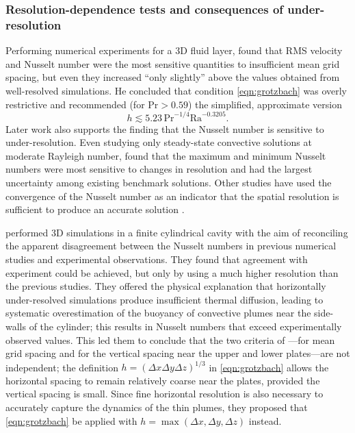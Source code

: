 \documentclass[titlepage]{article}
\numberwithin{equation}{section}
\newcommand{\prandtl}{\ensuremath{\mathrm{Pr}}}
\newcommand{\rayleigh}{\ensuremath{\mathrm{Ra}}}
\begin{document}
\subsubsection{
    Resolution-dependence tests and consequences of under-resolution}%
\label{sec:res_tests}

Performing numerical experiments for a 3D fluid layer,
\citeauthor{grotzbach1983} found that RMS velocity and Nusselt number were
the most sensitive quantities to insufficient mean grid spacing, but even
they increased ``only slightly'' above the values obtained from well-resolved
simulations. He concluded that condition \cref{eqn:grotzbach} was overly
restrictive and recommended (for $\prandtl > 0.59$) the simplified,
approximate version
\[ %
    h \lesssim 5.23 \, \prandtl^{-1/4} \rayleigh^{-0.3205}.
\]
Later work also supports the finding that the Nusselt number is
sensitive to under-resolution. Even studying only steady-state convective
solutions at moderate Rayleigh number, \textcite{le_quere1991} found that the
maximum and minimum Nusselt numbers were most sensitive to changes in
resolution and had the largest uncertainty among existing benchmark solutions.
Other studies have used the convergence of the Nusselt number as an indicator
that the spatial resolution is sufficient to produce an accurate solution
\parencite{ouertatani2008}.

\textcite{stevens2010} performed 3D simulations in a finite cylindrical cavity
with the aim of reconciling the apparent disagreement between the Nusselt
numbers in previous numerical studies and experimental observations. They found
that agreement with experiment could be achieved, but only by using a much
higher resolution than the previous studies. They offered the physical
explanation that horizontally under-resolved simulations produce insufficient
thermal diffusion, leading to systematic overestimation of the buoyancy of
convective plumes near the side-walls of the cylinder; this results in Nusselt
numbers that exceed experimentally observed values. This led them to conclude
that the two criteria of \textcite{grotzbach1983}---for mean grid spacing
and for the vertical spacing near the upper and lower plates---are not
independent; the definition $h = (\Delta x \Delta y \Delta z)^{1/3}$ in
\cref{eqn:grotzbach} allows the horizontal spacing to remain relatively
coarse near the plates, provided the vertical spacing is small. Since
fine horizontal resolution is also necessary to accurately capture
the dynamics of the thin plumes, they proposed that \cref{eqn:grotzbach} be
applied with $h = \max(\Delta x, \Delta y, \Delta z)$ instead.
\end{document}

